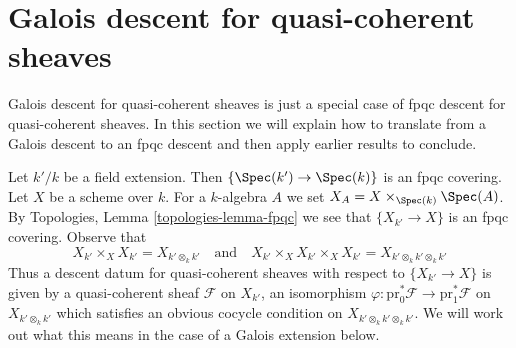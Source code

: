 \section{Galois descent for quasi-coherent sheaves}
\label{section-galois-descent}

\noindent
Galois descent for quasi-coherent sheaves is just a special
case of fpqc descent for quasi-coherent sheaves. In this section
we will explain how to translate from a Galois descent to
an fpqc descent and then apply earlier results to conclude.

\medskip\noindent
Let $k'/k$ be a field extension. Then $\{\Spec(k') \to \Spec(k)\}$
is an fpqc covering. Let $X$ be a scheme over $k$. For a $k$-algebra
$A$ we set $X_A = X \times_{\Spec(k)} \Spec(A)$. By
Topologies, Lemma \ref{topologies-lemma-fpqc}
we see that $\{X_{k'} \to X\}$ is an fpqc covering. Observe that
$$
X_{k'} \times_X X_{k'} = X_{k' \otimes_k k'}
\quad\text{and}\quad
X_{k'} \times_X X_{k'} \times_X X_{k'} = X_{k' \otimes_k k' \otimes_k k'}
$$
Thus a descent datum for quasi-coherent sheaves with respect to
$\{X_{k'} \to X\}$ is given by a quasi-coherent sheaf $\mathcal{F}$
on $X_{k'}$, an isomorphism
$\varphi : \text{pr}_0^*\mathcal{F} \to \text{pr}_1^*\mathcal{F}$
on $X_{k' \otimes_k k'}$
which satisfies an obvious cocycle condition on
$X_{k' \otimes_k k' \otimes_k k'}$.
We will work out what this means in the case of a Galois extension below.

